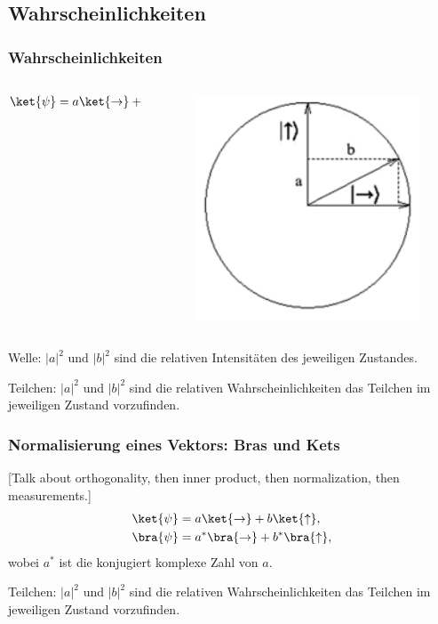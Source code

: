 \documentclass{beamer}
\begin{document}
\subsection{Wahrscheinlichkeiten}

\begin{frame}
\frametitle{Wahrscheinlichkeiten}
\begin{columns}
    \begin{column}{5cm}
        \begin{align*}
            \ket{\psi} &= a\ket{\to} + b\ket{\uparrow}
        \end{align*}
    \end{column}
    \begin{column}{5cm}
        \begin{figure}
            \centering
            \includegraphics[height=0.3\textheight]{fig24.png}
            \label{fig24}
        \end{figure}
    \end{column}
\end{columns}

\bigskip
Welle: $|a|^2$ und $|b|^2$ sind die relativen Intensit\"aten des jeweiligen Zustandes.

\bigskip
Teilchen: $|a|^2$ und $|b|^2$ sind die relativen Wahrscheinlichkeiten das Teilchen im jeweiligen Zustand vorzufinden.
\end{frame}

\begin{frame}
\frametitle{Normalisierung eines Vektors: Bras und Kets}
[Talk about orthogonality, then inner product, then normalization, then measurements.]
\begin{align*}
    \ket{\psi} &= a\ket{\to} + b\ket{\uparrow},
    \\
    \bra{\psi} &= a^*\bra{\to} + b^*\bra{\uparrow},
\end{align*}
wobei $a^*$ ist die konjugiert komplexe Zahl von $a$.

\bigskip
Teilchen: $|a|^2$ und $|b|^2$ sind die relativen Wahrscheinlichkeiten das Teilchen im jeweiligen Zustand vorzufinden.
\end{frame}
\end{document}
